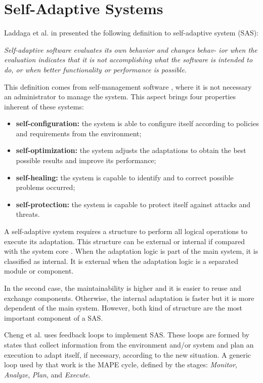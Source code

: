 %




\section {Self-Adaptive Systems}

Laddaga et al. in \cite{SAS01} presented the following definition to self-adaptive system (SAS):

\textit{Self-adaptive software evaluates its own behavior and changes behav- ior when the evaluation indicates that it is not accomplishing what the software is intended to do, or when better functionality or performance is possible.}

This definition comes from self-management software \cite{SAS02}, where it is not necessary an administrator to manage the system. This aspect brings four properties inherent of these systems:
\begin{itemize}
    \item \textbf{self-configuration:} the system is able to configure itself according to policies and requirements from the environment;
    \item \textbf{self-optimization:} the system adjusts the adaptations to obtain the best possible results and improve its performance;
    \item \textbf{self-healing:} the system is capable to identify and to correct possible problems occurred;
    \item \textbf{self-protection:} the system is capable to protect itself against attacks and threats.
\end{itemize}

A self-adaptive system requires a structure to perform all logical operations to execute its adaptation. This structure can be external or internal if compared with the system core \cite{SAS03}. When the adaptation logic is part of the main system, it is classified as internal. It is external when the adaptation logic is a separated module or component. 

In the second case, the maintainability is higher and it is easier to reuse and exchange components. Otherwise, the internal adaptation is faster but it is more dependent of the main system. However, both kind of structure are the most important component of a SAS.

Cheng et al. \cite{SAS04} uses feedback loops to implement SAS. These loops are formed by states that collect information from the environment and/or system and plan an execution to adapt itself, if necessary, according to the new situation. A generic loop used by that work is the MAPE cycle, defined by the stages: \textit{Monitor}, \textit{Analyze}, \textit{Plan}, and \textit{Execute}.

